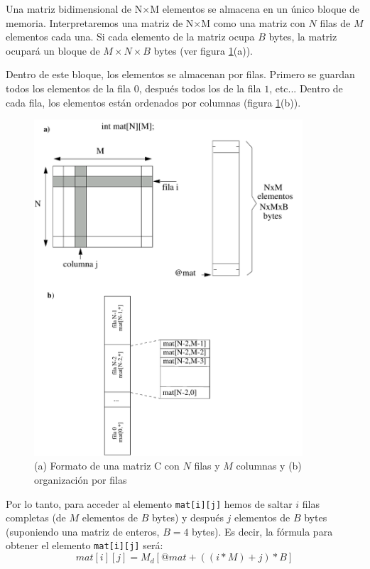  Una matriz bidimensional de N$\times$M
elementos se almacena en un único bloque de memoria. Interpretaremos
una matriz de N$\times$M como una matriz con $N$ filas de $M$ elementos cada
una. Si cada elemento de la matriz ocupa $B$ bytes, la matriz ocupará un
bloque de  $M \times N \times B$ bytes (ver figura \ref{fig:dos_5}(a)).

Dentro de este bloque, los elementos se almacenan por filas. Primero
se guardan todos los elementos de la fila $0$, después todos los de la
fila $1$, etc... Dentro de cada fila, los elementos están ordenados por
columnas (figura \ref{fig:dos_5}(b)).


\begin{figure}[h]
  \centering
    \includegraphics[width=10cm]{graphs/2-5.pdf}
  \caption{(a) Formato de una matriz  C con $N$ filas y $M$ columnas y (b)
organización por filas}
  \label{fig:dos_5}
\end{figure}

Por lo tanto, para acceder al elemento {\tt mat[i][j]} hemos de saltar
$i$ filas completas (de $M$ elementos de $B$ bytes) y después $j$
elementos de $B$ bytes (suponiendo una matriz de enteros, $B= 4$ bytes). Es
decir, la fórmula para obtener el elemento {\tt mat[i][j]} será:
\begin{equation}
mat[i][j] = M_d[@mat + ((i*M)+j)*B] 
\label{eq:accesoelemmatriz}
\end{equation}


